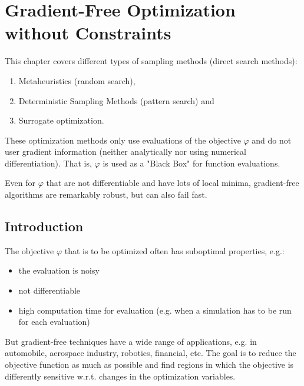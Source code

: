 \chapter{Gradient-Free Optimization without Constraints}
	This chapter covers different types of sampling methods (direct search methods):
	\begin{enumerate}
		\item Metaheuristics (random search),
		\item Deterministic Sampling Methods (pattern search) and
		\item Surrogate optimization.
	\end{enumerate}
	These optimization methods only use evaluations of the objective \(\varphi\) and do not user gradient information (neither analytically nor using numerical differentiation). That is, \(\varphi\) is used as a "Black Box" for function evaluations.

	Even for \(\varphi\) that are not differentiable and have lots of local minima, gradient-free algorithms are remarkably robust, but can also fail fast.

	\section{Introduction}
		The objective \(\varphi\) that is to be optimized often has suboptimal properties, e.g.:
		\begin{itemize}
			\item the evaluation is noisy
			\item not differentiable
			\item high computation time for evaluation (e.g. when a simulation has to be run for each evaluation)
		\end{itemize}

		But gradient-free techniques have a wide range of applications, e.g. in automobile, aerospace industry, robotics, financial, etc. The goal is to reduce the objective function as much as possible and find regions in which the objective is differently sensitive w.r.t. changes in the optimization variables.

